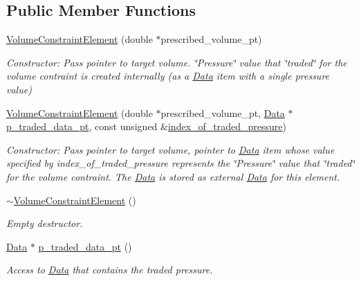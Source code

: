 \subsection*{Public Member Functions}
\begin{DoxyCompactItemize}
\item 
\hyperlink{classoomph_1_1VolumeConstraintElement_a641eea5633b1ddd2d9f79e5731947660}{Volume\+Constraint\+Element} (double $\ast$prescribed\+\_\+volume\+\_\+pt)
\begin{DoxyCompactList}\small\item\em Constructor\+: Pass pointer to target volume. \char`\"{}\+Pressure\char`\"{} value that \char`\"{}traded\char`\"{} for the volume contraint is created internally (as a \hyperlink{classoomph_1_1Data}{Data} item with a single pressure value) \end{DoxyCompactList}\item 
\hyperlink{classoomph_1_1VolumeConstraintElement_adc0fc16f4fc708fb09d70cb791a6c6b9}{Volume\+Constraint\+Element} (double $\ast$prescribed\+\_\+volume\+\_\+pt, \hyperlink{classoomph_1_1Data}{Data} $\ast$\hyperlink{classoomph_1_1VolumeConstraintElement_a60d17437a54648747c956b7a7067c592}{p\+\_\+traded\+\_\+data\+\_\+pt}, const unsigned \&\hyperlink{classoomph_1_1VolumeConstraintElement_ada831157effca052df0fae723c21c426}{index\+\_\+of\+\_\+traded\+\_\+pressure})
\begin{DoxyCompactList}\small\item\em Constructor\+: Pass pointer to target volume, pointer to \hyperlink{classoomph_1_1Data}{Data} item whose value specified by index\+\_\+of\+\_\+traded\+\_\+pressure represents the \char`\"{}\+Pressure\char`\"{} value that \char`\"{}traded\char`\"{} for the volume contraint. The \hyperlink{classoomph_1_1Data}{Data} is stored as external \hyperlink{classoomph_1_1Data}{Data} for this element. \end{DoxyCompactList}\item 
\hyperlink{classoomph_1_1VolumeConstraintElement_a160b5edcca9ce59bbd6afe90c3729bbb}{$\sim$\+Volume\+Constraint\+Element} ()
\begin{DoxyCompactList}\small\item\em Empty destructor. \end{DoxyCompactList}\item 
\hyperlink{classoomph_1_1Data}{Data} $\ast$ \hyperlink{classoomph_1_1VolumeConstraintElement_a60d17437a54648747c956b7a7067c592}{p\+\_\+traded\+\_\+data\+\_\+pt} ()
\begin{DoxyCompactList}\small\item\em Access to \hyperlink{classoomph_1_1Data}{Data} that contains the traded pressure. \end{DoxyCompactList}\item 

\end{DoxyCompactItemize}

